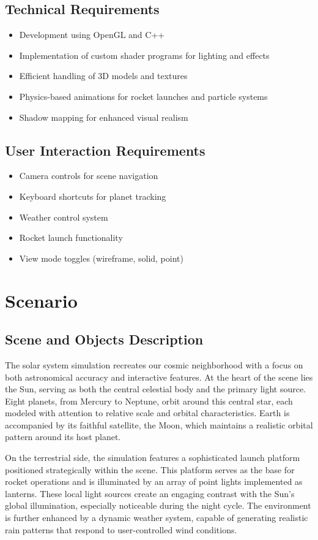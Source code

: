 \documentclass[12pt]{report}
\begin{document}
\section{Technical Requirements}
\begin{itemize}
    \item Development using OpenGL and C++
    \item Implementation of custom shader programs for lighting and effects
    \item Efficient handling of 3D models and textures
    \item Physics-based animations for rocket launches and particle systems
    \item Shadow mapping for enhanced visual realism
\end{itemize}

\section{User Interaction Requirements}
\begin{itemize}
    \item Camera controls for scene navigation
    \item Keyboard shortcuts for planet tracking
    \item Weather control system
    \item Rocket launch functionality
    \item View mode toggles (wireframe, solid, point)
\end{itemize}

\chapter{Scenario}

\section{Scene and Objects Description}
The solar system simulation recreates our cosmic neighborhood with a focus on both astronomical accuracy and interactive features. At the heart of the scene lies the Sun, serving as both the central celestial body and the primary light source. Eight planets, from Mercury to Neptune, orbit around this central star, each modeled with attention to relative scale and orbital characteristics. Earth is accompanied by its faithful satellite, the Moon, which maintains a realistic orbital pattern around its host planet.

On the terrestrial side, the simulation features a sophisticated launch platform positioned strategically within the scene. This platform serves as the base for rocket operations and is illuminated by an array of point lights implemented as lanterns. These local light sources create an engaging contrast with the Sun's global illumination, especially noticeable during the night cycle. The environment is further enhanced by a dynamic weather system, capable of generating realistic rain patterns that respond to user-controlled wind conditions.
\end{document}
